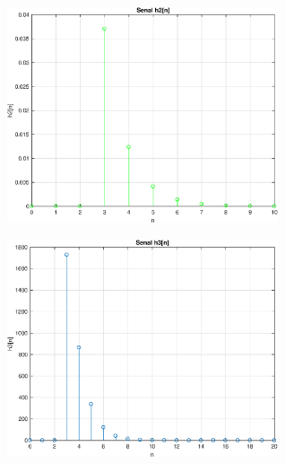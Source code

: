 \documentclass[journal]{IEEEtran}
\begin{document}
\includegraphics [width=8cm]{ejercicio1_02.eps}

\includegraphics [width=8cm]{ejercicio1_03.eps}
\end{document}
